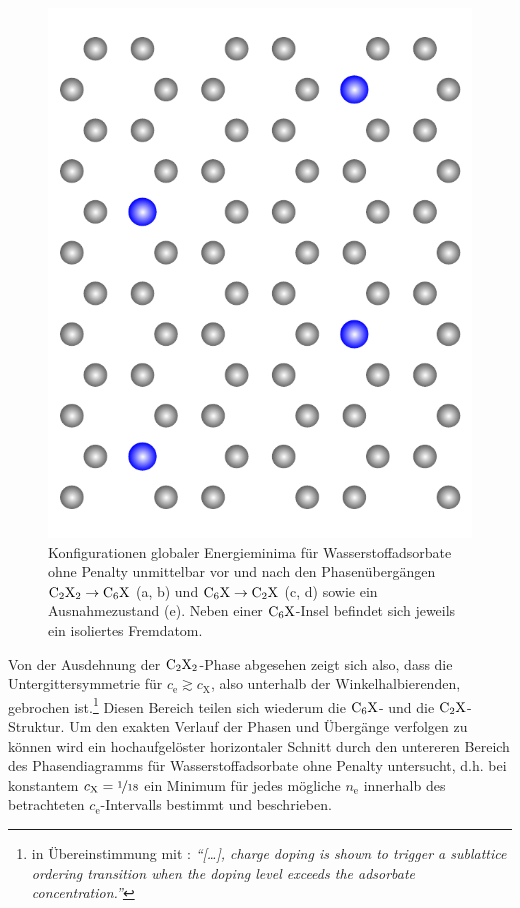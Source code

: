 \documentclass[a4paper, 10pt, twoside, openany]{book} %
\def \nE {n_\mathrm{e}}
\def \cE {c_\mathrm{e}}
\def \cX {c_\mathrm{X}}
\begin{document}
\begin{figure}
\begin{minipage}[b]{0.19\textwidth}
        \includegraphics[width=\textwidth]{Abbildungen/ne108.pdf}
        \subcaption{$\nE = 108$}
    \end{minipage}
    \caption[Konfigurationen globaler Energieminima]{Konfigurationen globaler Energieminima für Wasserstoffadsorbate ohne Penalty unmittelbar vor und nach den Phasenübergängen $\rm C_2X_2 \rightarrow \rm C_6X$ (a, b) und $\rm C_6X \rightarrow C_2X$ (c, d) sowie ein Ausnahmezustand (e). Neben einer $\rm C_6X$-Insel befindet sich jeweils ein isoliertes Fremdatom.}
    \label{Phasenvergleich exakt}
\end{figure}
%
Von der Ausdehnung der $\rm C_2X_2$-Phase abgesehen zeigt sich also, dass die Untergittersymmetrie für $\cE \gtrsim \cX$, also unterhalb der Winkelhalbierenden, gebrochen ist.\footnote{in Übereinstimmung mit \cite[S. 1]{Wehling2}: \emph{"`\emph{[\dots]}, charge doping is shown to trigger a sublattice ordering transition when the doping level exceeds the adsorbate concentration."'}} Diesen Bereich teilen sich wiederum die $\rm C_6X$- und die $\rm C_2X$-Struktur. Um den exakten Verlauf der Phasen und Übergänge verfolgen zu können wird ein hochaufgelöster horizontaler Schnitt durch den untereren Bereich des Phasendiagramms für Wasserstoffadsorbate ohne Penalty untersucht, d.h. bei konstantem $\cX = \nicefrac 1 {18}$ ein Minimum für jedes mögliche $\nE$ innerhalb des betrachteten $\cE$-Intervalls bestimmt und beschrieben.
\end{document}

